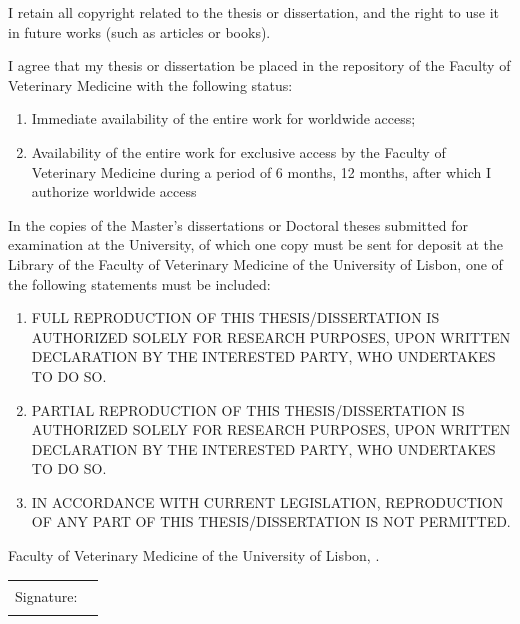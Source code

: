 I retain all copyright related to the thesis or dissertation, and the right to use it in future works (such as articles or books).

I agree that my thesis or dissertation be placed in the repository of the Faculty of Veterinary Medicine with the following status:
\begin{enumerate}
  \item {} Immediate availability of the entire work for worldwide access;
  \item {} Availability of the entire work for exclusive access by the Faculty of Veterinary Medicine during a period of  6 months,
 12 months, after which I authorize worldwide access%
\end{enumerate}

{\footnotesize In the copies of the Master's dissertations or Doctoral theses submitted for examination at the University, of which one copy must be sent for deposit at the Library of the Faculty of Veterinary Medicine of the University of Lisbon, one of the following statements must be included:}
\begin{enumerate}
  \item [\checkbox{reproduction}{I}]
        FULL REPRODUCTION OF THIS THESIS/DISSERTATION IS AUTHORIZED SOLELY FOR RESEARCH PURPOSES, 
        UPON WRITTEN DECLARATION BY THE INTERESTED PARTY, WHO UNDERTAKES TO DO SO.
  \item [\checkbox{reproduction}{P}]
        PARTIAL REPRODUCTION OF THIS THESIS/DISSERTATION IS AUTHORIZED SOLELY FOR RESEARCH PURPOSES, 
        UPON WRITTEN DECLARATION BY THE INTERESTED PARTY, WHO UNDERTAKES TO DO SO.
  \item [\checkbox{reproduction}{N}]
        IN ACCORDANCE WITH CURRENT LEGISLATION, REPRODUCTION OF ANY PART OF THIS 
        THESIS/DISSERTATION IS NOT PERMITTED.
\end{enumerate}

Faculty of Veterinary Medicine of the University of Lisbon,
.\par
\bigskip
\begin{tabularx}{\linewidth}{@{}lX@{}}
Signature: & \rule{\linewidth}{0.75pt}
\end{tabularx}
\egroup
